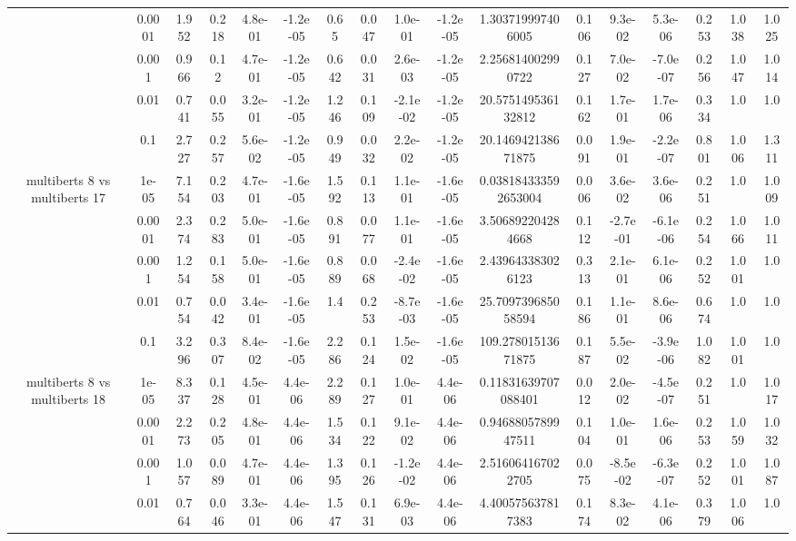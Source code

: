 \begin{tabular}{|c|c|c|c|c|c|c|c|c|c|c|c|c|c|c|c|c|}
 & 0.0001 & 1.952 & 0.218 & 4.8e-01 & -1.2e-05 & 0.65 & 0.047 & 1.0e-01 & -1.2e-05 & 1.303719997406005 & 0.106 & 9.3e-02 & 5.3e-06 & 0.253 & 1.038 & 1.025 \\
 & 0.001 & 0.966 & 0.12 & 4.7e-01 & -1.2e-05 & 0.642 & 0.031 & 2.6e-03 & -1.2e-05 & 2.256814002990722 & 0.127 & 7.0e-02 & -7.0e-07 & 0.256 & 1.047 & 1.014 \\
 & 0.01 & 0.741 & 0.055 & 3.2e-01 & -1.2e-05 & 1.246 & 0.109 & -2.1e-02 & -1.2e-05 & 20.575149536132812 & 0.162 & 1.7e-01 & 1.7e-06 & 0.334 & 1.0 & 1.0 \\
 & 0.1 & 2.727 & 0.257 & 5.6e-02 & -1.2e-05 & 0.949 & 0.032 & 2.2e-02 & -1.2e-05 & 20.146942138671875 & 0.091 & 1.9e-01 & -2.2e-07 & 0.801 & 1.006 & 1.311 \\
\hline
\multirow{5}{*}{multiberts 8 vs multiberts 17} & 1e-05 & 7.154 & 0.203 & 4.7e-01 & -1.6e-05 & 1.592 & 0.113 & 1.1e-01 & -1.6e-05 & 0.038184333592653004 & 0.006 & 3.6e-02 & 3.6e-06 & 0.251 & 1.0 & 1.009 \\
 & 0.0001 & 2.374 & 0.283 & 5.0e-01 & -1.6e-05 & 0.891 & 0.077 & 1.1e-01 & -1.6e-05 & 3.506892204284668 & 0.112 & -2.7e-01 & -6.1e-06 & 0.254 & 1.066 & 1.011 \\
 & 0.001 & 1.254 & 0.158 & 5.0e-01 & -1.6e-05 & 0.889 & 0.068 & -2.4e-02 & -1.6e-05 & 2.439643383026123 & 0.313 & 2.1e-01 & 6.1e-06 & 0.252 & 1.001 & 1.0 \\
 & 0.01 & 0.754 & 0.042 & 3.4e-01 & -1.6e-05 & 1.4 & 0.253 & -8.7e-03 & -1.6e-05 & 25.709739685058594 & 0.186 & 1.1e-01 & 8.6e-06 & 0.674 & 1.0 & 1.0 \\
 & 0.1 & 3.296 & 0.307 & 8.4e-02 & -1.6e-05 & 2.286 & 0.124 & 1.5e-02 & -1.6e-05 & 109.27801513671875 & 0.187 & 5.5e-02 & -3.9e-06 & 1.082 & 1.001 & 1.0 \\
\hline
\multirow{5}{*}{multiberts 8 vs multiberts 18} & 1e-05 & 8.337 & 0.128 & 4.5e-01 & 4.4e-06 & 2.289 & 0.127 & 1.0e-01 & 4.4e-06 & 0.11831639707088401 & 0.012 & 2.0e-02 & -4.5e-07 & 0.251 & 1.0 & 1.017 \\
 & 0.0001 & 2.273 & 0.205 & 4.8e-01 & 4.4e-06 & 1.534 & 0.122 & 9.1e-02 & 4.4e-06 & 0.9468805789947511 & 0.104 & 1.0e-01 & 1.6e-06 & 0.253 & 1.059 & 1.032 \\
 & 0.001 & 1.057 & 0.089 & 4.7e-01 & 4.4e-06 & 1.395 & 0.126 & -1.2e-02 & 4.4e-06 & 2.516064167022705 & 0.075 & -8.5e-02 & -6.3e-07 & 0.252 & 1.001 & 1.087 \\
 & 0.01 & 0.764 & 0.046 & 3.3e-01 & 4.4e-06 & 1.547 & 0.131 & 6.9e-03 & 4.4e-06 & 4.400575637817383 & 0.174 & 8.3e-02 & 4.1e-06 & 0.379 & 1.006 & 1.0 \\

\end{tabular}
